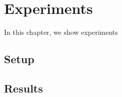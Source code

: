 \chapter{Experiments}\label{ch:exp}

In this chapter,
we show experiments

\section{Setup}\label{sec:exp_setup}

\section{Results}\label{sec:exp_results}
